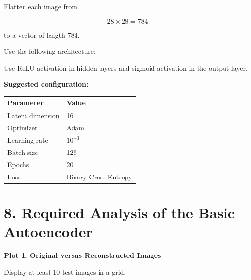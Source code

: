 \documentclass[10pt]{article}
\begin{document}
Flatten each image from

\[
28\times28=784
\]

to a vector of length 784.

Use the following architecture:

\begin{center}
\end{center}

Use ReLU activation in hidden layers and sigmoid activation in the output
layer.

\textbf{Suggested configuration:}

\begin{center}
\begin{tabular}{|l|l|}
\hline
Parameter & Value\\
\hline
Latent dimension & 16\\
Optimizer & Adam\\
Learning rate & $10^{-3}$\\
Batch size & 128\\
Epochs & 20\\
Loss & Binary Cross-Entropy\\
\hline
\end{tabular}
\end{center}

\section*{8. Required Analysis of the Basic Autoencoder}

\textbf{Plot 1: Original versus Reconstructed Images}

Display at least 10 test images in a grid.
\end{document}
